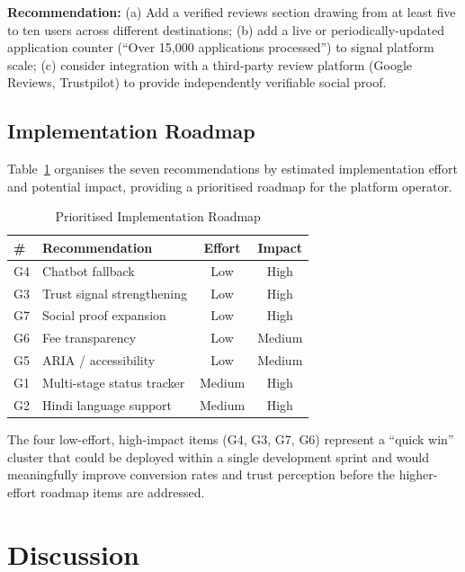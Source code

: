 \documentclass[journal, 10pt, twoside]{IEEEtran}
\begin{document}
\textbf{Recommendation:} (a) Add a verified reviews section drawing
from at least five to ten users across different destinations;
(b) add a live or periodically-updated application counter (``Over
15,000 applications processed'') to signal platform scale; (c) consider
integration with a third-party review platform (Google Reviews, Trustpilot)
to provide independently verifiable social proof.

\subsection{Implementation Roadmap}
Table~\ref{tab:roadmap} organises the seven recommendations by estimated
implementation effort and potential impact, providing a prioritised roadmap
for the platform operator.

\begin{table}[ht]
  \centering
  \caption{Prioritised Implementation Roadmap}
  \label{tab:roadmap}
  \begin{tabular}{@{}p{0.3cm} p{3.0cm} c c@{}}
    \toprule
    \textbf{\#} & \textbf{Recommendation} & \textbf{Effort} &
    \textbf{Impact} \\
    \midrule
    G4 & Chatbot fallback          & Low    & High \\
    G3 & Trust signal strengthening & Low   & High \\
    G7 & Social proof expansion    & Low    & High \\
    G6 & Fee transparency          & Low    & Medium \\
    G5 & ARIA / accessibility      & Low    & Medium \\
    G1 & Multi-stage status tracker & Medium & High \\
    G2 & Hindi language support    & Medium & High \\
    \bottomrule
  \end{tabular}
\end{table}

The four low-effort, high-impact items (G4, G3, G7, G6) represent a
``quick win'' cluster that could be deployed within a single development
sprint and would meaningfully improve conversion rates and trust perception
before the higher-effort roadmap items are addressed.



\section{Discussion}
\label{sec:discussion}
\end{document}
